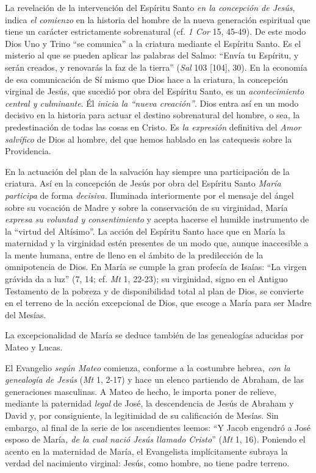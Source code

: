 \documentclass[]{article}
\begin{document}
La revelación de la intervención del Espíritu Santo \emph{en la
concepción de Jesús}, indica \emph{el comienzo} en la historia del
hombre de la nueva generación espiritual que tiene un carácter
estrictamente sobrenatural (cf. \emph{1 Cor} 15, 45-49). De este modo
Dios Uno y Trino ``se comunica'' a la criatura mediante el Espíritu
Santo. Es el misterio al que se pueden aplicar las palabras del Salmo:
``Envía tu Espíritu, y serán creados, y renovarás la faz de la tierra''
(\emph{Sal} 103 {[}104{]}, 30). En la economía de esa comunicación de Sí
mismo que Dios hace a la criatura, la concepción virginal de Jesús, que
sucedió por obra del Espíritu Santo, es un \emph{acontecimiento central
y culminante}. Él \emph{inicia la ``nueva creación''}. Dios entra así en
un modo decisivo en la historia para actuar el destino sobrenatural del
hombre, o sea, la predestinación de todas las cosas en Cristo. Es
\emph{la expresión} definitiva del \emph{Amor salvífico} de Dios al
hombre, del que hemos hablado en las catequesis sobre la Providencia.

En la actuación del plan de la salvación hay siempre una participación
de la criatura. Así en la concepción de Jesús por obra del Espíritu
Santo \emph{María participa} de forma \emph{decisiva.} Iluminada
interiormente por el mensaje del ángel sobre su vocación de Madre y
sobre la conservación de su virginidad, María \emph{expresa su voluntad
y consentimiento} y acepta hacerse el humilde instrumento de la ``virtud
del Altísimo''. La acción del Espíritu Santo hace que en María la
maternidad y la virginidad estén presentes de un modo que, aunque
inaccesible a la mente humana, entre de lleno en el ámbito de la
predilección de la omnipotencia de Dios. En María se cumple la gran
profecía de Isaías: ``La virgen grávida da a luz'' (7, 14; cf. \emph{Mt}
1, 22-23); su virginidad, signo en el Antiguo Testamento de la pobreza y
de disponibilidad total al plan de Dios, se convierte en el terreno de
la acción excepcional de Dios, que escoge a María para ser Madre del
Mesías.

La excepcionalidad de María se deduce también de las genealogías
aducidas por Mateo y Lucas.

El Evangelio \emph{según Mateo} comienza, conforme a la costumbre
hebrea\emph{, con la genealogía de Jesús} (\emph{Mt} 1, 2-17) y hace un
elenco partiendo de Abraham, de las generaciones masculinas. A Mateo de
hecho, le importa poner de relieve, mediante la paternidad \emph{legal}
de José, la descendencia de Jesús de Abraham y David y, por
consiguiente, la legitimidad de su calificación de Mesías. Sin embargo,
al final de la serie de los ascendientes leemos: ``Y Jacob engendró a
José esposo de María\emph{, de la cual nació Jesús llamado Cristo}''
(\emph{Mt} 1, 16). Poniendo el acento en la maternidad de María, el
Evangelista implícitamente subraya la verdad del nacimiento virginal:
Jesús, como hombre, no tiene padre terreno.
\end{document}
